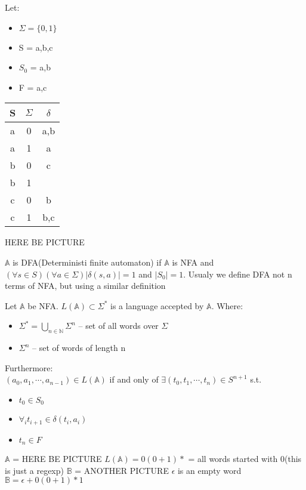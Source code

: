 \ex{}
{
    Let:
    \begin{itemize}
        \item $\Sigma = \{0,1\}$
        \item S = {a,b,c}
        \item  $S_0$ = {a,b}
        \item F = {a,c}
            
    \end{itemize}
    \begin{center}
    \begin{tabular}{|c|c|c|}
    \hline
    S & $\Sigma$ &  $\delta$  \\
    \hline
    a & 0 & {a,b} \\
    \hline
    a &1 &{a}\\
    \hline
    b & 0 & {c} \\
    \hline
    b & 1 & \null \\
    \hline
    c & 0 & {b}\\
    \hline
    c & 1 & {b,c}\\
    \hline
    \end{tabular}
    \end{center}
HERE BE PICTURE

}


{
    $\mathbb{A}$ is DFA(Deterministi finite automaton) if
    $\mathbb{A}$ is NFA and $(\forall s \in S )(\forall a \in \Sigma ) |\delta(s,a)| = 1$ and $|S_0| = 1$.
    \nt
    {
        Usualy we define DFA not n terms of NFA, but using a similar definition
    }
}

{
    Let $\mathbb{A}$ be NFA. $L(\mathbb{A}) \subset \Sigma^*$ is a language accepted by $\mathbb{A}$. Where:
    \begin{itemize}
        \item $\Sigma^* = \bigcup_{n\in \mathbb{N}} \Sigma^n$ -- set of all words over  $\Sigma$
        \item $\Sigma^n$ -- set of words of length n
            
    \end{itemize}
 Furthermore:\\
 $(a_0,a_1,\cdots ,a_{n-1}) \in L(\mathbb{A})$ if and only of $\exists (t_0,t_1,\cdots ,t_n) \in S^{n+1}$ s.t.
 \begin{itemize}
         \item $t_0 \in S_0$
         \item $\forall_i t_{i+1} \in \delta(t_i,a_i) $ 
         \item $t_n \in F$
         
 \end{itemize}
 \ex{}
 {
     $\mathbb{A}$ = 
     HERE BE PICTURE
     $L(\mathbb{A}) = 0(0+1)*$ = all words started with 0(this is just a regexp)
 }
 \ex{}
 {
    $\mathbb{B}$ = 
    ANOTHER PICTURE
    $\epsilon$ is an empty word
    $\mathbb{B} = \epsilon + 0(0+1)*1$
 }
}

